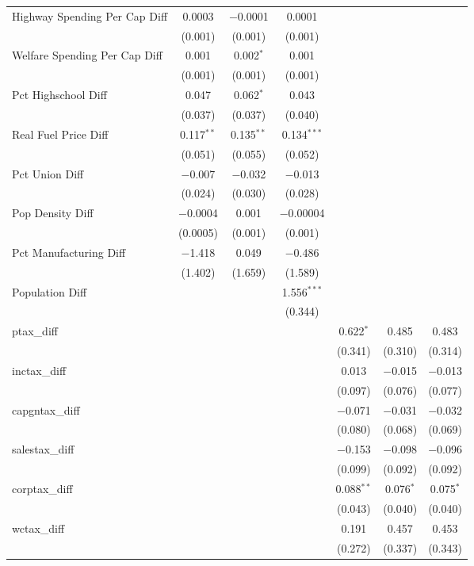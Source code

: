 \begin{table}[!htbp]
\begin{tabular}{@{\extracolsep{5pt}}lcccccc}
  Highway Spending Per Cap Diff & 0.0003 & $-$0.0001 & 0.0001 &  &  &  \\ 
  & (0.001) & (0.001) & (0.001) &  &  &  \\ 
  Welfare Spending Per Cap Diff & 0.001 & 0.002$^{*}$ & 0.001 &  &  &  \\ 
  & (0.001) & (0.001) & (0.001) &  &  &  \\ 
  Pct Highschool Diff & 0.047 & 0.062$^{*}$ & 0.043 &  &  &  \\ 
  & (0.037) & (0.037) & (0.040) &  &  &  \\ 
  Real Fuel Price Diff & 0.117$^{**}$ & 0.135$^{**}$ & 0.134$^{***}$ &  &  &  \\ 
  & (0.051) & (0.055) & (0.052) &  &  &  \\ 
  Pct Union Diff & $-$0.007 & $-$0.032 & $-$0.013 &  &  &  \\ 
  & (0.024) & (0.030) & (0.028) &  &  &  \\ 
  Pop Density Diff & $-$0.0004 & 0.001 & $-$0.00004 &  &  &  \\ 
  & (0.0005) & (0.001) & (0.001) &  &  &  \\ 
  Pct Manufacturing Diff & $-$1.418 & 0.049 & $-$0.486 &  &  &  \\ 
  & (1.402) & (1.659) & (1.589) &  &  &  \\ 
  Population Diff &  &  & 1.556$^{***}$ &  &  &  \\ 
  &  &  & (0.344) &  &  &  \\ 
  ptax\_diff &  &  &  & 0.622$^{*}$ & 0.485 & 0.483 \\ 
  &  &  &  & (0.341) & (0.310) & (0.314) \\ 
  inctax\_diff &  &  &  & 0.013 & $-$0.015 & $-$0.013 \\ 
  &  &  &  & (0.097) & (0.076) & (0.077) \\ 
  capgntax\_diff &  &  &  & $-$0.071 & $-$0.031 & $-$0.032 \\ 
  &  &  &  & (0.080) & (0.068) & (0.069) \\ 
  salestax\_diff &  &  &  & $-$0.153 & $-$0.098 & $-$0.096 \\ 
  &  &  &  & (0.099) & (0.092) & (0.092) \\ 
  corptax\_diff &  &  &  & 0.088$^{**}$ & 0.076$^{*}$ & 0.075$^{*}$ \\ 
  &  &  &  & (0.043) & (0.040) & (0.040) \\ 
  wctax\_diff &  &  &  & 0.191 & 0.457 & 0.453 \\ 
  &  &  &  & (0.272) & (0.337) & (0.343) \\ 

\end{tabular}
\end{table}
